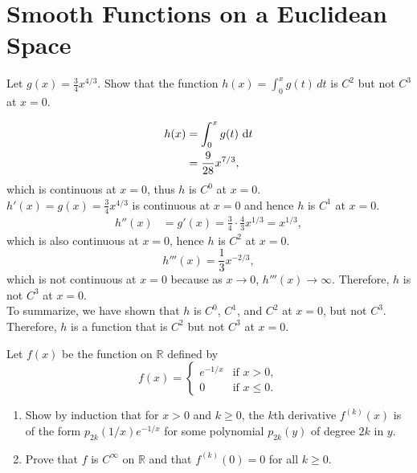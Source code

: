 \documentclass[en, oneside]{vivi}
\begin{document}
\section{Smooth Functions on a Euclidean Space}
\begin{prob}
    Let $g(x) = \frac{3}{4} x^{4/3}$. Show that the function $h(x) = \int_0^x g(t) \, dt$ is $C^2$ but not $C^3$ at $x = 0$.
\end{prob}

\begin{sol}
    \begin{align*}
        h(x) &= \int_0^x g(t) \dif t\\
        &= \frac{9}{28} x^{7/3},
    \end{align*}
    which is continuous at $x = 0$, thus $h$ is $C^0$ at $x = 0$.\\
    $h'(x) = g(x) = \frac{3}{4} x^{4/3}$ is continuous at $x = 0$ and hence $h$ is $C^1$ at $x = 0$.
    \begin{align*}
        h''(x) &= g'(x) = \frac{3}{4} \cdot \frac{4}{3} x^{1/3} = x^{1/3},
    \end{align*}
    which is also continuous at $x = 0$, hence $h$ is $C^2$ at $x = 0$.
    \begin{equation*}
        h'''(x) = \frac{1}{3} x^{-2/3},
    \end{equation*}
    which is not continuous at $x = 0$ because as $x \to 0$, $h'''(x) \to \infty$. Therefore, $h$ is not $C^3$ at $x = 0$.\\
    To summarize, we have shown that $h$ is $C^0$, $C^1$, and $C^2$ at $x = 0$, but not $C^3$. Therefore, $h$ is a function that is $C^2$ but not $C^3$ at $x = 0$.
\end{sol}

\begin{prob}
    Let $f(x)$ be the function on $\mathbb{R}$ defined by
    \begin{equation*}
        f(x) = \begin{cases}
            e^{-1/x} & \text{if } x > 0,\\
            0 & \text{if } x \leq 0.
        \end{cases}
    \end{equation*}
    \begin{enumerate}[label=(\alph*)]
        \item Show by induction that for $x > 0$ and $k \geq 0$, the $k$th derivative $f^{(k)}(x)$ is of the form $p_{2k}(1/x) e^{-1/x}$ for some polynomial $p_{2k}(y)$ of degree $2k$ in $y$.
        \item Prove that $f$ is $C^\infty$ on $\mathbb{R}$ and that $f^{(k)}(0) = 0$ for all $k \geq 0$.
    \end{enumerate}
\end{prob}
\end{document}
